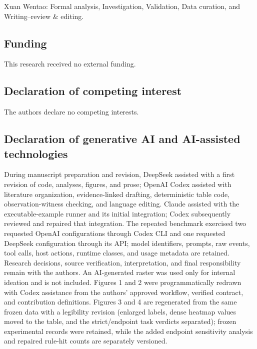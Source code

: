 Xuan Wentao: Formal analysis, Investigation, Validation, Data curation, and Writing--review \& editing.

\subsection*{Funding}

This research received no external funding.

\subsection*{Declaration of competing interest}

The authors declare no competing interests.

\subsection*{Declaration of generative AI and AI-assisted technologies}

During manuscript preparation and revision, DeepSeek assisted with a first revision of code, analyses, figures, and prose; OpenAI Codex assisted with literature organization, evidence-linked drafting, deterministic table code, observation-witness checking, and language editing. Claude assisted with the executable-example runner and its initial integration; Codex subsequently reviewed and repaired that integration. The repeated benchmark exercised two requested OpenAI configurations through Codex CLI and one requested DeepSeek configuration through its API; model identifiers, prompts, raw events, tool calls, host actions, runtime classes, and usage metadata are retained. Research decisions, source verification, interpretation, and final responsibility remain with the authors. An AI-generated raster was used only for internal ideation and is not included. Figures 1 and 2 were programmatically redrawn with Codex assistance from the authors' approved workflow, verified contract, and contribution definitions. Figures 3 and 4 are regenerated from the same frozen data with a legibility revision (enlarged labels, dense heatmap values moved to the table, and the strict/endpoint task verdicts separated); frozen experimental records were retained, while the added endpoint sensitivity analysis and repaired rule-hit counts are separately versioned.
